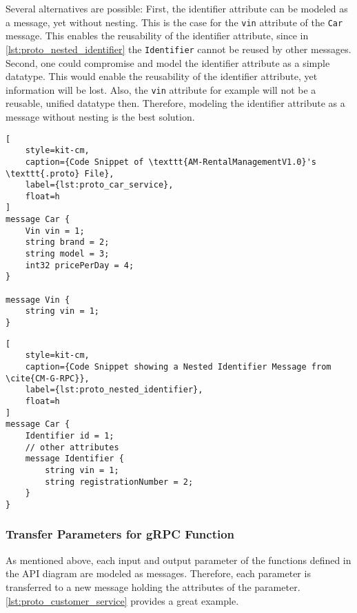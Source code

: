 Several alternatives are possible:
First, the identifier attribute can be modeled as a message, yet without nesting.
This is the case for the \texttt{vin} attribute of the \texttt{Car} message.
This enables the reusability of the identifier attribute, since in \autoref{lst:proto_nested_identifier} the \texttt{Identifier} cannot be reused by other messages.
Second, one could compromise and model the identifier attribute as a simple datatype.
This would enable the reusability of the identifier attribute, yet information will be lost.
Also, the \texttt{vin} attribute for example will not be a reusable, unified datatype then.
Therefore, modeling the identifier attribute as a message without nesting is the best solution.

\begin{lstlisting}[
    style=kit-cm,
    caption={Code Snippet of \texttt{AM-RentalManagementV1.0}'s \texttt{.proto} File},
    label={lst:proto_car_service},
    float=h
]
message Car {
    Vin vin = 1;
    string brand = 2;
    string model = 3;
    int32 pricePerDay = 4;
}

message Vin {
    string vin = 1;
}
\end{lstlisting}

\begin{lstlisting}[
    style=kit-cm,
    caption={Code Snippet showing a Nested Identifier Message from \cite{CM-G-RPC}},
    label={lst:proto_nested_identifier},
    float=h
]
message Car {
    Identifier id = 1;
    // other attributes
    message Identifier {
        string vin = 1;
        string registrationNumber = 2;
    }
}
\end{lstlisting}

\subsubsection*{Transfer Parameters for gRPC Function}
As mentioned above, each input and output parameter of the functions defined in the API diagram are modeled as messages.
Therefore, each parameter is transferred to a new message holding the attributes of the parameter.
\autoref{lst:proto_customer_service} provides a great example.

